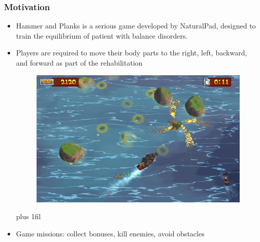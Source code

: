 \documentclass{beamer}
\makeatletter
\def\normaljustify{%
  \let\\\@centercr\rightskip\z@skip \leftskip\z@skip%
  \parfillskip=0pt plus 1fil}
\makeatother
\begin{document}
\begin{frame}
\frametitle{Motivation}
\centering

\begin{itemize}
\item Hammer and Planks is a serious game developed by NaturalPad, designed to train the equilibrium of patient with balance disorders.\\
\item Players are required to move their body parts to the right, left, backward, and forward as part of the rehabilitation\\
\begin{figure}
\includegraphics[scale=0.16]{images/hp_game.png}
\end{figure}
\normaljustify
{}\item Game missions: collect bonuses, kill enemies, avoid obstacles
\end{itemize}

\end{frame}
\end{document}
